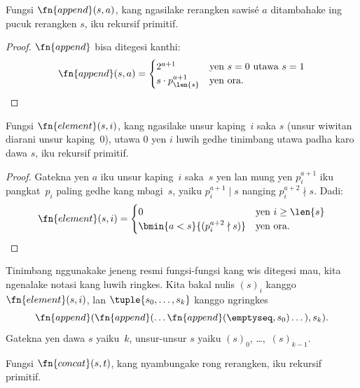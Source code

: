 \documentclass[../../../include/open-logic-section]{subfiles}
\begin{document}
\begin{prop}
  Fungsi $\fn{append}(s,a)$, kang ngasilake rerangken
  sawisé $a$ ditambahake ing pucuk rerangken $s$,
  iku rekursif primitif.
\end{prop}

\begin{proof}
  $\fn{append}$ bisa ditegesi kanthi:
  \[
  \fn{append}(s,a) =
  \begin{cases}
    2^{a+1} & \text{yen $s = 0$ utawa $s = 1$} \\
    s \cdot p_{\len{s}}^{a+1} & \text{yen ora.}
  \end{cases}
  \]
\end{proof}

\begin{prop}
  Fungsi $\fn{element}(s,i)$, kang ngasilake unsur
  kaping~$i$ saka $s$ (unsur wiwitan diarani
  unsur kaping~$0$), utawa $0$ yen $i$ luwih
  gedhe tinimbang utawa padha karo dawa $s$,
  iku rekursif primitif.
\end{prop}

\begin{proof}
Gatekna yen $a$ iku unsur kaping~$i$ saka~$s$
yen lan mung yen $p_i^{a+1}$ iku pangkat~$p_i$
paling gedhe kang mbagi~$s$, yaiku
$p_i^{a+1} \mid s$ nanging
$p_i^{a+2} \nmid s$. Dadi:
  \[
  \fn{element}(s,i) =
  \begin{cases}
    0 & \mbox{yen $i \geq \len{s}$} \\
    \bmin{a < s}{(p_i^{a+2} \nmid s)} & \text{yen ora.}
  \end{cases}
  \]
\end{proof}

Tinimbang nggunakake jeneng resmi fungsi-fungsi
kang wis ditegesi mau, kita ngenalake notasi kang
luwih ringkes. Kita bakal nulis $(s)_i$ kanggo
$\fn{element}(s,i)$, lan
$\tuple{s_0, \dots, s_k}$ kanggo ngringkes
\[
\fn{append}(\fn{append}(\dots \fn{append}(\emptyseq,s_0)
\dots),s_k).
\]
Gatekna yen dawa $s$ yaiku~$k$, unsur-unsur $s$ yaiku
$(s)_0$, \dots,~$(s)_{k-1}$.

\begin{prop}
Fungsi $\fn{concat}(s,t)$, kang nyambungake rong
rerangken, iku rekursif primitif.
\end{prop}
\end{document}
